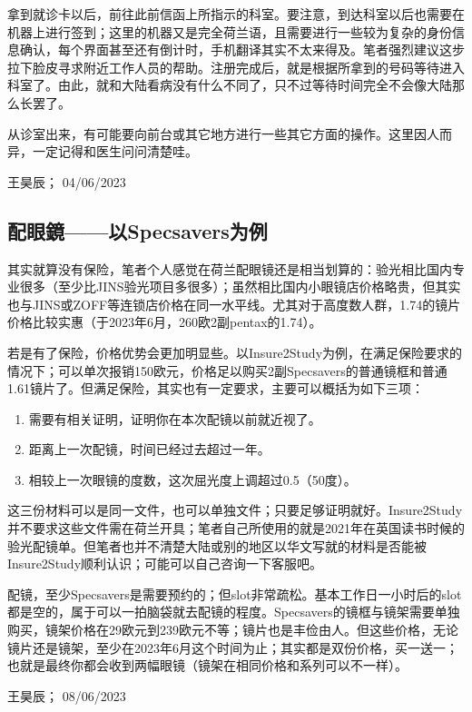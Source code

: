 拿到就诊卡以后，前往此前信函上所指示的科室。要注意，到达科室以后也需要在机器上进行签到；这里的机器又是完全荷兰语，且需要进行一些较为复杂的身份信息确认，每个界面甚至还有倒计时，手机翻译其实不太来得及。笔者强烈建议这步拉下脸皮寻求附近工作人员的帮助。注册完成后，就是根据所拿到的号码等待进入科室了。由此，就和大陆看病没有什么不同了，只不过等待时间完全不会像大陆那么长罢了。

从诊室出来，有可能要向前台或其它地方进行一些其它方面的操作。这里因人而异，一定记得和医生问问清楚哇。
\begin{flushright}
王昊辰； 04/06/2023
\end{flushright}

\subsection{配眼鏡——以Specsavers为例}
其实就算没有保险，笔者个人感觉在荷兰配眼镜还是相当划算的：验光相比国内专业很多（至少比JINS验光项目多很多）；虽然相比国内小眼镜店价格略贵，但其实也与JINS或ZOFF等连锁店价格在同一水平线。尤其对于高度数人群，1.74的镜片价格比较实惠（于2023年6月，260欧2副pentax的1.74）。

若是有了保险，价格优势会更加明显些。以Insure2Study为例，在满足保险要求的情况下；可以单次报销150欧元，价格足以购买2副Specsavers的普通镜框和普通1.61镜片了。但满足保险，其实也有一定要求，主要可以概括为如下三项：

\begin{enumerate}
\item 需要有相关证明，证明你在本次配镜以前就近视了。
\item 距离上一次配镜，时间已经过去超过一年。
\item 相较上一次眼镜的度数，这次屈光度上调超过0.5（50度）。
\end{enumerate}

这三份材料可以是同一文件，也可以单独文件；只要足够证明就好。Insure2Study并不要求这些文件需在荷兰开具；笔者自己所使用的就是2021年在英国读书时候的验光配镜单。但笔者也并不清楚大陆或别的地区以华文写就的材料是否能被Insure2Study顺利认识；可能可以自己咨询一下客服吧。

配镜，至少Specsavers是需要预约的；但slot非常疏松。基本工作日一小时后的slot都是空的，属于可以一拍脑袋就去配镜的程度。Specsavers的镜框与镜架需要单独购买，镜架价格在29欧元到239欧元不等；镜片也是丰俭由人。但这些价格，无论镜片还是镜架，至少在2023年6月这个时间为止；其实都是双份价格，买一送一；也就是最终你都会收到两幅眼镜（镜架在相同价格和系列可以不一样）。
\begin{flushright}
王昊辰； 08/06/2023
\end{flushright}


